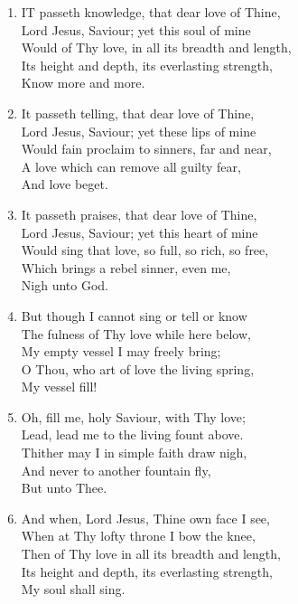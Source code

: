 \begin{enumerate}
    \item IT passeth knowledge, that dear love of Thine, \\
        Lord Jesus, Saviour; yet this soul of mine \\
        Would of Thy love, in all its breadth and length, \\
        Its height and depth, its everlasting strength, \\
            Know more and more.

    \item It passeth telling, that dear love of Thine, \\
        Lord Jesus, Saviour; yet these lips of mine \\
        Would fain proclaim to sinners, far and near, \\
        A love which can remove all guilty fear, \\
            And love beget.

    \item It passeth praises, that dear love of Thine, \\
        Lord Jesus, Saviour; yet this heart of mine \\
        Would sing that love, so full, so rich, so free, \\
        Which brings a rebel sinner, even me, \\
            Nigh unto God.

    \item But though I cannot sing or tell or know \\
        The fulness of Thy love while here below, \\
        My empty vessel I may freely bring; \\
        O Thou, who art of love the living spring, \\
            My vessel fill!

    \item Oh, fill me, holy Saviour, with Thy love; \\
        Lead, lead me to the living fount above. \\
        Thither may I in simple faith draw nigh, \\
        And never to another fountain fly, \\
            But unto Thee.

    \item And when, Lord Jesus, Thine own face I see, \\
        When at Thy lofty throne I bow the knee, \\
        Then of Thy love in all its breadth and length, \\
        Its height and depth, its everlasting strength, \\
            My soul shall sing.

\end{enumerate}

